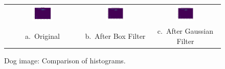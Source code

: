 \documentclass[]{IEEEtran}
\begin{document}
  \begin{figure}[t]
  \centering
  \begin{tabular}{c c c}
  \includegraphics[width=0.3\textwidth]{./figures/3/dog-hsvhist.png} &
  \includegraphics[width=0.3\textwidth]{./figures/3/dog-3-1-1-box9-hsvhist.png} &
  \includegraphics[width=0.3\textwidth]{./figures/3/dog-3-1-1-gaussian15-hsvhist.png} \\
  a.~Original & b.~After Box Filter & c.~After Gaussian Filter
  \end{tabular}
  \caption{Dog image: Comparison of histograms.}
  \label{figure:dog-hsv-hist}
  \end{figure}
\end{document}
